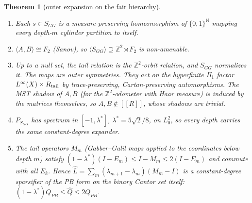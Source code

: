 \documentclass[11pt]{article}
\newtheorem{theorem}{Theorem}[section]
\theoremstyle{definition}
\theoremstyle{remark}
\newcommand{\Z}{\mathbb Z}
\newcommand{\N}{\mathbb N}
\newcommand{\ff}[1]{[\![#1]\!]}
\begin{document}
\begin{theorem}[outer expansion on the fair hierarchy]\label{thm:outer}
\begin{enumerate}
\item Each $s\in S_{GG}$ is a measure-preserving homeomorphism of $\{0,1\}^{\N}$ mapping \emph{every} depth-$m$ cylinder partition to itself.
\item $\langle A,B\rangle\cong F_2$ (Sanov), so $\langle S_{GG}\rangle\supseteq\Z^2\rtimes F_2$ is non-amenable.
\item Up to a null set, the tail relation is the $\Z^2$-orbit relation, and $S_{GG}$ normalizes it. The maps are outer symmetries. They act on the hyperfinite II$_1$ factor $L^\infty(X)\rtimes R_{\rm tail}$ by trace-preserving, Cartan-preserving automorphisms. The MST shadow of $A,B$ (for the $\Z^2$-odometer with Haar measure) is induced by the matrices themselves, so $A,B\notin\ff R$, whose shadows are trivial.
\item $P_{S_{GG}}$ has spectrum in $[-1,\lambda^*]$, $\lambda^*=5\sqrt2/8$, on $L^2_0$, so every depth carries the same constant-degree expander.
\item The tail operators $M_m$ (Gabber--Galil maps applied to the coordinates below depth $m$) satisfy $(1-\lambda^*)(I-E_m)\le I-M_m\le2(I-E_m)$ and commute with all $E_k$. Hence $\hat L=\sum_m(\lambda_{m+1}-\lambda_m)(M_m-I)$ is a constant-degree sparsifier of the PB form on the binary Cantor set itself: $(1-\lambda^*)Q_{PB}\le\hat Q\le2Q_{PB}$.
\end{enumerate}
\end{theorem}
\end{document}
